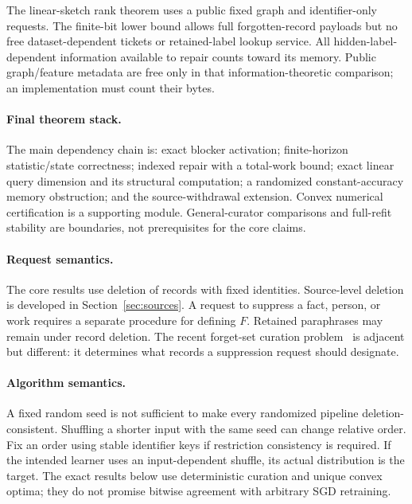 \documentclass[11pt,a4paper]{article}
\theoremstyle{definition}\newtheorem{definition}[theorem]{Definition}
\begin{document}
The linear-sketch rank theorem uses a public fixed graph and identifier-only requests. The finite-bit lower bound allows full forgotten-record payloads but no free dataset-dependent tickets or retained-label lookup service. All hidden-label-dependent information available to repair counts toward its memory. Public graph/feature metadata are free only in that information-theoretic comparison; an implementation must count their bytes.

\paragraph{Final theorem stack.} The main dependency chain is: exact blocker activation; finite-horizon statistic/state correctness; indexed repair with a total-work bound; exact linear query dimension and its structural computation; a randomized constant-accuracy memory obstruction; and the source-withdrawal extension. Convex numerical certification is a supporting module. General-curator comparisons and full-refit stability are boundaries, not prerequisites for the core claims.

\paragraph{Request semantics.} The core results use deletion of records with fixed identities. Source-level deletion is developed in Section~\ref{sec:sources}. A request to suppress a fact, person, or work requires a separate procedure for defining $F$. Retained paraphrases may remain under record deletion. The recent forget-set curation problem~\cite{jha2026} is adjacent but different: it determines what records a suppression request should designate.

\paragraph{Algorithm semantics.} A fixed random seed is not sufficient to make every randomized pipeline deletion-consistent. Shuffling a shorter input with the same seed can change relative order. Fix an order using stable identifier keys if restriction consistency is required. If the intended learner uses an input-dependent shuffle, its actual distribution is the target. The exact results below use deterministic curation and unique convex optima; they do not promise bitwise agreement with arbitrary SGD retraining.
\end{document}
